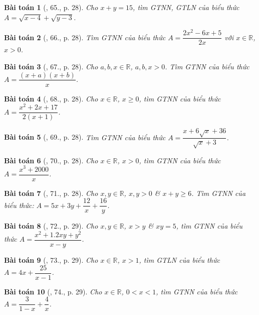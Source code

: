 \documentclass{article}
\newtheorem{baitoan}{Bài toán}
\begin{document}
\begin{baitoan}[\cite{Tuyen_Toan_9}, 65., p. 28]
	Cho $x + y = 15$, tìm {\rm GTNN}, {\rm GTLN} của biểu thức $A = \sqrt{x - 4} + \sqrt{y - 3}$.
\end{baitoan}

\begin{baitoan}[\cite{Tuyen_Toan_9}, 66., p. 28]
	Tìm {\rm GTNN} của biểu thức $A = \dfrac{2x^2 - 6x + 5}{2x}$ với $x\in\mathbb{R}$, $x > 0$.
\end{baitoan}

\begin{baitoan}[\cite{Tuyen_Toan_9}, 67., p. 28]
	Cho $a,b,x\in\mathbb{R}$, $a,b,x > 0$. Tìm {\rm GTNN} của biểu thức $A = \dfrac{(x + a)(x + b)}{x}$.
\end{baitoan}

\begin{baitoan}[\cite{Tuyen_Toan_9}, 68., p. 28]
	Cho $x\in\mathbb{R}$, $x\ge0$, tìm {\rm GTNN} của biểu thức $A = \dfrac{x^2 + 2x + 17}{2(x + 1)}$.
\end{baitoan}

\begin{baitoan}[\cite{Tuyen_Toan_9}, 69., p. 28]
	Tìm {\rm GTNN} của biểu thức $A = \dfrac{x + 6\sqrt{x} + 36}{\sqrt{x} + 3}$.
\end{baitoan}

\begin{baitoan}[\cite{Tuyen_Toan_9}, 70., p. 28]
	Cho $x\in\mathbb{R}$, $x > 0$, tìm {\rm GTNN} của biểu thức $A = \dfrac{x^3 + 2000}{x}$.
\end{baitoan}

\begin{baitoan}[\cite{Tuyen_Toan_9}, 71., p. 28]
	Cho $x,y\in\mathbb{R}$, $x,y > 0$ \& $x + y\ge6$. Tìm {\rm GTNN} của biểu thức: $A = 5x + 3y + \dfrac{12}{x} + \dfrac{16}{y}$.
\end{baitoan}

\begin{baitoan}[\cite{Tuyen_Toan_9}, 72., p. 29]
	Cho $x,y\in\mathbb{R}$, $x > y$ \& $xy = 5$, tìm {\rm GTNN} của biểu thức $A = \dfrac{x^2 + 1.2xy + y^2}{x - y}$.
\end{baitoan}

\begin{baitoan}[\cite{Tuyen_Toan_9}, 73., p. 29]
	Cho $x\in\mathbb{R}$, $x > 1$, tìm {\rm GTLN} của biểu thức $A = 4x + \dfrac{25}{x - 1}$.
\end{baitoan}

\begin{baitoan}[\cite{Tuyen_Toan_9}, 74., p. 29]
	Cho $x\in\mathbb{R}$, $0 < x < 1$, tìm {\rm GTNN} của biểu thức $A = \dfrac{3}{1 - x} + \dfrac{4}{x}$.
\end{baitoan}
\end{document}
